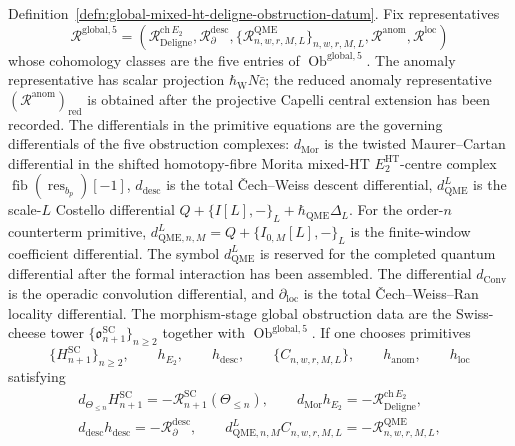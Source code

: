 \documentclass[11pt]{memoir}
\begin{document}
\begin{thm}
	  Definition~\ref{defn:global-mixed-ht-deligne-obstruction-datum}.  Fix
	  representatives
	  \[
	    \mathcal R^{\mathrm{global},5}
	    =
	    \left(
	    \mathcal R^{\mathrm{ch}\,E_2}_{\mathrm{Deligne}},
	    \mathcal R^{\mathrm{desc}}_{\partial},
		    \{\mathcal R^{\mathrm{QME}}_{n,w,r,M,L}\}_{n,w,r,M,L},
	    \mathcal R^{\mathrm{anom}},
	    \mathcal R^{\mathrm{loc}}
	    \right)
	  \]
	  whose cohomology classes are the five entries of
	  \(\operatorname{Ob}^{\mathrm{global},5}\).  The anomaly
	  representative has scalar projection \(\hbar_{\mathrm{W}}N\bar c\); the reduced
	  anomaly representative
	  \((\mathcal R^{\mathrm{anom}})_{\mathrm{red}}\) is obtained after the
	  projective Capelli central extension has been recorded.  The differentials in the
	  primitive equations are the governing differentials of the five
	  obstruction complexes: \(d_{\mathrm{Mor}}\) is the twisted
	  Maurer--Cartan differential in the shifted homotopy-fibre Morita
	  mixed-HT \(E_2^{\mathrm{HT}}\)-centre complex
	  \(\operatorname{fib}(\operatorname{res}_{b_p})[-1]\),
	  \(d_{\mathrm{desc}}\) is the total
	  \v{C}ech--Weiss descent differential, \(d_{\mathrm{QME}}^{L}\) is the
	  scale-\(L\) Costello differential
	  \(Q+\{I[L],-\}_L+\hbar_{\mathrm{QME}}\Delta_L\).  For the order-\(n\)
	  counterterm primitive,
	  \(d^{L}_{\mathrm{QME},n,M}=Q+\{I_{0,M}[L],-\}_L\) is the
	  finite-window coefficient differential.  The symbol \(d_{\mathrm{QME}}^L\)
	  is reserved for the completed quantum differential after the formal
	  interaction has been assembled.  The differential \(d_{\mathrm{Conv}}\) is the
	  operadic convolution differential, and
	  \(\partial_{\mathrm{loc}}\) is the total
	  \v{C}ech--Weiss--Ran locality differential.
	  The morphism-stage global obstruction data are the
	  Swiss-cheese tower
	  \(\{\mathfrak o^{\mathrm{SC}}_{n+1}\}_{n\ge2}\) together with
	  \(\operatorname{Ob}^{\mathrm{global},5}\).
	  If one chooses primitives
	  \[
	    \{H^{\mathrm{SC}}_{n+1}\}_{n\ge2},\qquad
	    h_{E_2},\qquad h_{\mathrm{desc}},\qquad
	    \{C_{n,w,r,M,L}\},\qquad h_{\mathrm{anom}},\qquad h_{\mathrm{loc}}
	  \]
	  satisfying
	  \[
	  \begin{gathered}
	    d_{\Theta_{\le n}}H^{\mathrm{SC}}_{n+1}
	    =-\mathcal R^{\mathrm{SC}}_{n+1}(\Theta_{\le n}),\qquad
	    d_{\mathrm{Mor}}h_{E_2}
	    =-\mathcal R^{\mathrm{ch}\,E_2}_{\mathrm{Deligne}},\\
	    d_{\mathrm{desc}}h_{\mathrm{desc}}
	    =-\mathcal R^{\mathrm{desc}}_{\partial},\qquad
			    d^{L}_{\mathrm{QME},n,M}C_{n,w,r,M,L}
			    =-\mathcal R^{\mathrm{QME}}_{n,w,r,M,L},\\

\end{gathered}\]
\end{thm}
\end{document}
